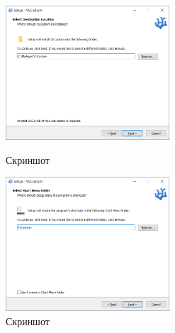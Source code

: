 \begin{figure}[!phtb]
    \centering

    \begin{minipage}{0.49\textwidth}
        \centering

        \includegraphics[height=5cm]
        {images/install/vs-codium/3.png}

        \caption{Скриншот}

        \label{fig:vscodium_3}
    \end{minipage}
    \begin{minipage}{0.49\textwidth}
        \centering

        \includegraphics[height=5cm]
        {images/install/vs-codium/4.png}

        \caption{Скриншот}

        \label{fig:vscodium_4}
    \end{minipage}
\end{figure}

